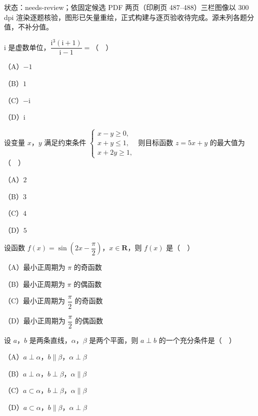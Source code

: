 

状态：needs-review；依固定候选 PDF 两页（印刷页 487–488）三栏图像以 300 dpi 渲染逐题核验，图形已矢量重绘，正式构建与逐页验收待完成。源未列各题分值，不补分值。


\begin{question}
$\mathrm i$ 是虚数单位，$\dfrac{\mathrm i^3(\mathrm i+1)}{\mathrm i-1}=$（　）

（A）$-1$

（B）$1$

（C）$-\mathrm i$

（D）$\mathrm i$

\end{question}
\begin{question}
设变量 $x$，$y$ 满足约束条件 $\begin{cases}x-y\geqslant0,\\ x+y\leqslant1,\\ x+2y\geqslant1,\end{cases}$ 则目标函数 $z=5x+y$ 的最大值为（　）

（A）$2$

（B）$3$

（C）$4$

（D）$5$

\end{question}
\begin{question}
设函数 $f(x)=\sin\left(2x-\dfrac{\pi}2\right)$，$x\in\mathbf R$，则 $f(x)$ 是（　）

（A）最小正周期为 $\pi$ 的奇函数

（B）最小正周期为 $\pi$ 的偶函数

（C）最小正周期为 $\dfrac{\pi}2$ 的奇函数

（D）最小正周期为 $\dfrac{\pi}2$ 的偶函数

\end{question}
\begin{question}
设 $a$，$b$ 是两条直线，$\alpha$，$\beta$ 是两个平面，则 $a\perp b$ 的一个充分条件是（　）

（A）$a\perp\alpha$，$b\parallel\beta$，$\alpha\perp\beta$

（B）$a\perp\alpha$，$b\perp\beta$，$\alpha\parallel\beta$

（C）$a\subset\alpha$，$b\perp\beta$，$\alpha\parallel\beta$

（D）$a\subset\alpha$，$b\parallel\beta$，$\alpha\perp\beta$

\end{question}

